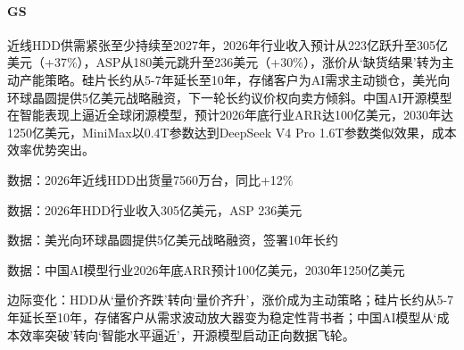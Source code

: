 \documentclass[11pt]{ctexart}
\begin{document}
\paragraph{GS} 近线HDD供需紧张至少持续至2027年，2026年行业收入预计从223亿跃升至305亿美元（+37\%），ASP从180美元跳升至236美元（+30\%），涨价从‘缺货结果’转为主动产能策略。硅片长约从5-7年延长至10年，存储客户为AI需求主动锁仓，美光向环球晶圆提供5亿美元战略融资，下一轮长约议价权向卖方倾斜。中国AI开源模型在智能表现上逼近全球闭源模型，预计2026年底行业ARR达100亿美元，2030年达1250亿美元，MiniMax以0.4T参数达到DeepSeek V4 Pro 1.6T参数类似效果，成本效率优势突出。
{\small\color{refgray}数据：2026年近线HDD出货量7560万台，同比+12\%\par}
{\small\color{refgray}数据：2026年HDD行业收入305亿美元，ASP 236美元\par}
{\small\color{refgray}数据：美光向环球晶圆提供5亿美元战略融资，签署10年长约\par}
{\small\color{refgray}数据：中国AI模型行业2026年底ARR预计100亿美元，2030年1250亿美元\par}
{\small\color{refgray}边际变化：HDD从‘量价齐跌’转向‘量价齐升’，涨价成为主动策略；硅片长约从5-7年延长至10年，存储客户从需求波动放大器变为稳定性背书者；中国AI模型从‘成本效率突破’转向‘智能水平逼近’，开源模型启动正向数据飞轮。\par}
\end{document}

